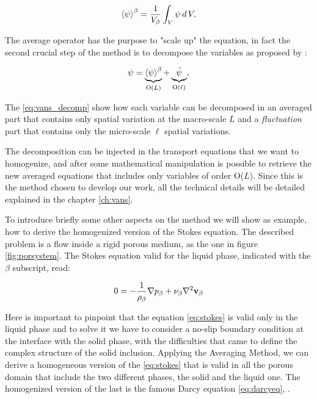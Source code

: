\begin{equation}
{\left< \psi \right>}^{\beta} = \dfrac{1}{V_\beta} \int_{V} \psi \, d \, V,
\label{eq:avg_intrinsic_intro}
\end{equation}

The average operator has the purpose to "scale up" the equation, in fact the second crucial step of the method is to decompose the variables as proposed by \citet{gray1975derivation}:

\begin{equation}
\psi =   \underbrace{ {\left< \psi \right>}^{\beta} }_\text{O($L$)}  +  \underbrace{\tilde{\psi} }_\text{O($\ell$)},
\label{eq:vans_decomp}
\end{equation}

The \eqref{eq:vans_decomp} show how each variable can be decomposed in an averaged part that contains only spatial variation at the macro-scale $L$ and a \textit{fluctuation} part that contains only the micro-scale $\ell$ spatial variations.

The decomposition can be injected in the transport equations that we want to homogenize, and after some mathematical manipulation is possible to retrieve the new averaged equations that includes only variables of order O($L$).
Since this is the method chosen to develop our work, all the technical details will be detailed explained in the chapter \ref{ch:vans}.

To introduce briefly some other aspects on the method we will show as example, how to derive the homogenized version of the Stokes equation. The described problem is a  flow inside a rigid porous medium, as the one in figure \ref{fig:porsystem}.
The Stokes equation valid for the liquid phase, indicated with the $\beta$ subscript, read:

\begin{equation}
0 = -\dfrac{1}{\rho_{\beta}} \nabla p_{\beta} +\nu_{\beta} \nabla^2 \textbf{v}_{\beta}
\label{eq:stokes}
\end{equation} 

Here is important to pinpoint that the equation \eqref{eq:stokes} is valid only in the liquid phase and to solve it we have to consider a no-slip boundary condition at the interface with the solid phase, with the difficulties that came to define the complex structure of the solid inclusion.
Applying the Averaging Method, we can derive a homogeneous version of the \eqref{eq:stokes} that is valid in all the porous domain that include the two different phases, the solid and the liquid one.
The homogenized version of the last is the famous Darcy equation \eqref{eq:darcyeq}, \citet{whitaker1986flow}.

